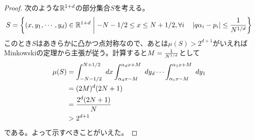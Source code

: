 \documentclass[10pt]{jsarticle}%
\begin{document}
\begin{proof}
次のような${\mathbb R}^{1+d}$の部分集合$S$を考える。
\[
S = \left\{ (x,y_1, \cdots , y_d) \in {\mathbb R}^{1+d} \mathrel{} \middle| \mathrel{}    -N-1/2 \leq x \leq N + 1/2, \forall i \quad  \left \lvert q {\alpha}_i - p_i \right \rvert \leq \frac{1}{N^{1/d}}  \right\}
\]
このとき$S$はあきらかに凸かつ点対称なので、あとは$\mu(S) > 2^{d+1}$がいえればMinkowskiの定理から主張が従う。計算すると$M = \frac{1}{N^{1/d}}$として
\begin{align*}
\mu(S) &= \int_{-N-1/2}^{N+1/2} \ dx \int_{{\alpha}_d x - M}^{{\alpha}_d x + M} \ dy_d \cdots \int_{{\alpha}_1 x - M}^{{\alpha}_1 x + M} \ dy_1 \\
&= (2M)^d (2N+1) \\
&= \frac{2^d (2N+1)}{N} \\
&> 2^{d+1}
\end{align*}
である。よって示すべきことがいえた。
\end{proof}

\end{document}
